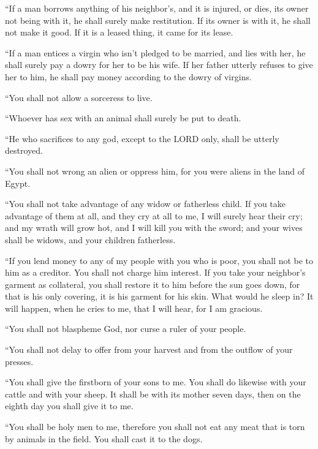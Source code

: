 \myverse{}“If a man borrows anything of his neighbor’s, and it is injured,
or dies, its owner not being with it, he shall surely make restitution.
\myverse{}If its owner is with it, he shall not make it good. If it is a leased thing,
it came for its lease.


\myverse{}“If a man entices a virgin who isn’t pledged to be married,
and lies with her, he shall surely pay a dowry for her to be his wife.
\myverse{}If her father utterly refuses to give her to him, he shall pay money according
to the dowry of virgins.


\myverse{}“You shall not allow a sorceress to live.


\myverse{}“Whoever has sex with an animal shall surely be put to death.


\myverse{}“He who sacrifices to any god, except to the LORD only, shall
be utterly destroyed.


\myverse{}“You shall not wrong an alien or oppress him, for you were aliens
in the land of Egypt.


\myverse{}“You shall not take advantage of any widow or fatherless child.
\myverse{}If you take advantage of them at all, and they cry at all to me, I will surely
hear their cry;
\myverse{}and my wrath will grow hot, and I will kill you with the sword; and your
wives shall be widows, and your children fatherless.


\myverse{}“If you lend money to any of my people with you who is poor,
you shall not be to him as a creditor. You shall not charge him interest.
\myverse{}If you take your neighbor’s garment as collateral, you shall restore it to
him before the sun goes down,
\myverse{}for that is his only covering, it is his garment for his skin. What would
he sleep in? It will happen, when he cries to me, that I will hear, for I am gracious.


\myverse{}“You shall not blaspheme God, nor curse a ruler of your people.


\myverse{}“You shall not delay to offer from your harvest and from the
outflow of your presses.

“You shall give the firstborn of your sons to me. \myverse{}You shall do likewise with your cattle and with your sheep. It shall be with
its mother seven days, then on the eighth day you shall give it to me.


\myverse{}“You shall be holy men to me, therefore you shall not eat any
meat that is torn by animals in the field. You shall cast it to the dogs.


